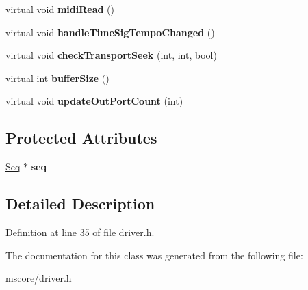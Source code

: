 \begin{DoxyCompactItemize}
\item 
\mbox{\label{class_ms_1_1_driver_a8a016edc4d69ffd9a214ea6ec344999b}} 
virtual void {\bfseries midi\+Read} ()
\item 
\mbox{\label{class_ms_1_1_driver_aaabcb0d206396d4a521bdef8c505a404}} 
virtual void {\bfseries handle\+Time\+Sig\+Tempo\+Changed} ()
\item 
\mbox{\label{class_ms_1_1_driver_ae3572c7b1f9a9fb20e68bd29832eec4c}} 
virtual void {\bfseries check\+Transport\+Seek} (int, int, bool)
\item 
\mbox{\label{class_ms_1_1_driver_acfe1c99e9fe3908122a7abe471cf469a}} 
virtual int {\bfseries buffer\+Size} ()
\item 
\mbox{\label{class_ms_1_1_driver_a550a468ca8d2bb330ec16ddc75d477f4}} 
virtual void {\bfseries update\+Out\+Port\+Count} (int)
\end{DoxyCompactItemize}
\subsection*{Protected Attributes}
\begin{DoxyCompactItemize}
\item 
\mbox{\label{class_ms_1_1_driver_aa6a278a84ce752029a77cc5ad025e0c5}} 
\hyperlink{class_ms_1_1_seq}{Seq} $\ast$ {\bfseries seq}
\end{DoxyCompactItemize}


\subsection{Detailed Description}


Definition at line 35 of file driver.\+h.



The documentation for this class was generated from the following file\+:\begin{DoxyCompactItemize}
\item 
mscore/driver.\+h\end{DoxyCompactItemize}
